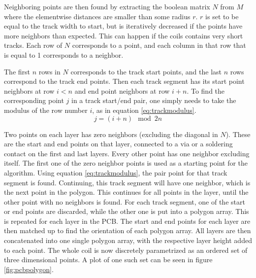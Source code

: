 Neighboring points are then found by extracting the boolean matrix $N$
from $M$ where the elementwise distances are smaller than some radius $r$.
$r$ is set to be equal to the track width to start, but is iteratively
decreased if the points have more neighbors than expected. This can happen
if the coils contains very short tracks. Each row of $N$ corresponds to
a point, and each column in that row that is equal to 1 corresponds to a
neighbor.

The first $n$ rows in $N$ corresponds to the track
start points, and the last $n$ rows correspond to the track end points.
Then each track segment has its start point neighbors at row $i<n$ and end
point neighbors at row $i+n$. To find the corresponding point $j$ in a track
start/end pair, one simply needs to take the modulus of the row number $i$,
as in equation \ref{eq:trackmodulus}.
\begin{equation}
    j = (i+n)\mod 2n
    \label{eq:trackmodulus}
\end{equation}

Two points on each layer has zero neighbors (excluding the diagonal in
$N$). These are the start and end
points on that layer, connected to a via or a soldering contact on the
first and last layers. Every other point has one neighbor excluding
itself.
The first one of the zero neighbor points is used as a starting point
for the algorithm. Using equation \ref{eq:trackmodulus}, the pair
point for that track segment is found. Continuing, this track segment
will have one neighbor, which is the next point in the polygon. This
continues for all points in the layer, until the other point with no
neighbors is found. For each track segment, one of the start or
end points are discarded, while the other one is put into a polygon
array. This is repeated for each layer in the PCB. The start and end
points for each layer are then matched up to find the orientation
of each polygon array. All layers are then concatenated into one
single polygon array, with the respective layer height added to
each point. The whole coil is now discretely parametrized as an
ordered set of three dimensional points. A plot of one such
set can be seen in figure \ref{fig:pcbpolygon}.

